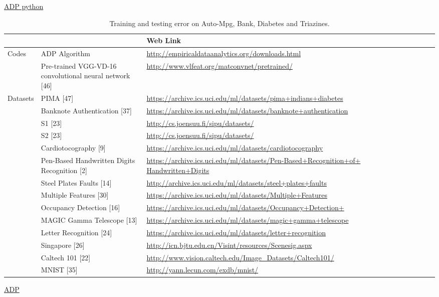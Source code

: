 {\href{https://github.com/Gu-X/Autonomous-Data-Partitioning-Algorithm}{ADP python}
\begin{sidewaystable}[!ht]
\caption{Training and testing error on Auto-Mpg, Bank, Diabetes and Triazines.}
\begin{center}
 \begin{tabular}{lp{10cm}lcccccccc}
\toprule
 &  &  Web Link  \\
\toprule
Codes &ADP Algorithm &\small{\url{http://empiricaldataanalytics.org/downloads.html}}\\
&Pre-trained VGG-VD-16 convolutional neural network [46]&\small{\url{http://www.vlfeat.org/matconvnet/pretrained/}}\\
Datasets &PIMA [47] &\small{\url{https://archive.ics.uci.edu/ml/datasets/pima+indians+diabetes}}\\
&Banknote Authentication [37] &\small{\url{https://archive.ics.uci.edu/ml/datasets/banknote+authentication}}\\
&S1 [23] &\small{\url{http://cs.joensuu.fi/sipu/datasets/}}\\
&S2 [23] &\small{\url{http://cs.joensuu.fi/sipu/datasets/}}\\
&Cardiotocography [9] &\small{\url{https://archive.ics.uci.edu/ml/datasets/cardiotocography}}\\
&Pen-Based Handwritten Digits Recognition [2] &\small{\url{https://archive.ics.uci.edu/ml/datasets/Pen-Based+Recognition+of+
Handwritten+Digits}}\\
&Steel Plates Faults [14] &\small{\url{http://archive.ics.uci.edu/ml/datasets/steel+plates+faults}}\\
&Multiple Features [30] &\small{\url{https://archive.ics.uci.edu/ml/datasets/Multiple+Features}}\\
&Occupancy Detection [16] &\small{\url{https://archive.ics.uci.edu/ml/datasets/Occupancy+Detection+}}\\
&MAGIC Gamma Telescope [13] &\small{\url{https://archive.ics.uci.edu/ml/datasets/magic+gamma+telescope}}\\
&Letter Recognition [24] &\small{\url{https://archive.ics.uci.edu/ml/datasets/letter+recognition}}\\
&Singapore [26] &\small{\url{http://icn.bjtu.edu.cn/Visint/resources/Scenesig.aspx}}\\
&Caltech 101 [22] &\small{\url{http://www.vision.caltech.edu/Image_Datasets/Caltech101/}}\\
&MNIST [35] &\small{\url{http://yann.lecun.com/exdb/mnist/}}\\
\bottomrule
\end{tabular}
\end{center}
\label{TT2-ELM170610:Sec5-3-1}
\end{sidewaystable}
\href{https://ww2.mathworks.cn/matlabcentral/fileexchange/67463-autonomous-data-partitioning-algorithm?s_tid=prof_contriblnk}{ADP}

}
